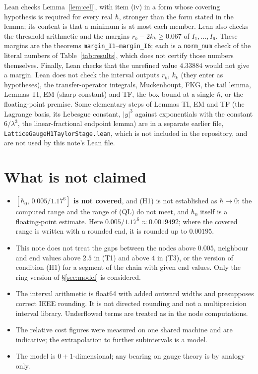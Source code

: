 \documentclass[11pt,a4paper]{article}
\theoremstyle{definition}
\theoremstyle{remark}
\begin{document}
Lean checks Lemma~\ref{lem:cell}, with item (iv) in a form whose covering hypothesis is required for every real $\hbar$, stronger than the form stated in the lemma; its content is that a minimum is at most each member. Lean also checks the threshold arithmetic and the margins $r_k-2k_k\ge0.067$ of $I_1,\dots,I_6$. These margins are the theorems \texttt{margin\_I1}--\texttt{margin\_I6}; each is a \texttt{norm\_num} check of the literal numbers of Table~\ref{tab:results}, which does not certify those numbers themselves. Finally, Lean checks that the unrefined value $4.33884$ would not give a margin. Lean does not check the interval outputs $r_k$, $k_k$ (they enter as hypotheses), the transfer-operator integrals, Muckenhoupt, FKG, the tail lemma, Lemmas TI, EM (sharp constant) and TF, the box bound at a single $\hbar$, or the floating-point premise. Some elementary steps of Lemmas TI, EM and TF (the Lagrange basis, its Lebesgue constant, $|y|^3$ against exponentials with the constant $6/\lambda^3$, the linear-fractional endpoint lemma) are in a separate earlier file, \texttt{LatticeGaugeH1TaylorStage.lean}, which is not included in the repository, and are not used by this note's Lean file.

\section{What is not claimed}\label{sec:notclaimed}
\begin{itemize}[leftmargin=2em]
\item \textbf{$[\hbar_0,\,0.005/1.17^6]$ is not covered}, and (H1) is not established as $\hbar\to0$: the computed range and the range of (QL) do not meet, and $\hbar_0$ itself is a floating-point estimate. Here $0.005/1.17^6\approx0.0019492$; where the covered range is written with a rounded end, it is rounded up to $0.00195$.
\item This note does not treat the gaps between the nodes above $0.005$, neighbour and end values above $2.5$ in (T1) and above $4$ in (T3), or the version of condition (H1) for a segment of the chain with given end values. Only the ring version of \S\ref{sec:model} is considered.
\item The interval arithmetic is float64 with added outward widths and presupposes correct IEEE rounding. It is not directed rounding and not a multiprecision interval library. Underflowed terms are treated as in the node computations.

\item The relative cost figures were measured on one shared machine and are indicative; the extrapolation to further subintervals is a model.
\item The model is $0+1$-dimensional; any bearing on gauge theory is by analogy only.
\end{itemize}
\end{document}
